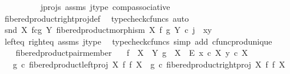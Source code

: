 \begin{isabellebody}
\ \ \ \ \ \ \ \ \isamarkupfalse%
\ j{\isacharunderscore}{\kern0pt}projs\ assms\ j{\isacharunderscore}{\kern0pt}type\ comp{\isacharunderscore}{\kern0pt}associative{}\isanewline
\ \ \ \ \ \ \ \ \isamarkupfalse%
\ fibered{\isacharunderscore}{\kern0pt}product{\isacharunderscore}{\kern0pt}right{\isacharunderscore}{\kern0pt}proj{\isacharunderscore}{\kern0pt}def\ \isamarkupfalse%
\ {\isacharparenleft}{\kern0pt}typecheck{\isacharunderscore}{\kern0pt}cfuncs{\isacharcomma}{\kern0pt}\ auto{\isacharparenright}{\kern0pt}\isanewline
\isanewline
\ \ \ \ \ \ \isamarkupfalse%
\ {\isachardoublequoteopen}snd\ {\isacharparenleft}{\kern0pt}X\ \isactrlbsub f\isactrlesub {\isasymtimes}\isactrlsub c\isactrlbsub g\isactrlesub \ Y{\isacharcomma}{\kern0pt}\ fibered{\isacharunderscore}{\kern0pt}product{\isacharunderscore}{\kern0pt}morphism\ X\ f\ g\ Y{\isacharparenright}{\kern0pt}\ {\isasymcirc}\isactrlsub c\ j\ {\isacharequal}{\kern0pt}\ {\isasymlangle}x{\isacharcomma}{\kern0pt}y{\isasymrangle}{\isachardoublequoteclose}\isanewline
\ \ \ \ \ \ \ \ \isamarkupfalse%
\ left{\isacharunderscore}{\kern0pt}eq\ right{\isacharunderscore}{\kern0pt}eq\ assms\ j{\isacharunderscore}{\kern0pt}type\ \isamarkupfalse%
\ {\isacharparenleft}{\kern0pt}typecheck{\isacharunderscore}{\kern0pt}cfuncs{\isacharcomma}{\kern0pt}\ simp\ add{\isacharcolon}{\kern0pt}\ cfunc{\isacharunderscore}{\kern0pt}prod{\isacharunderscore}{\kern0pt}unique{\isacharparenright}{\kern0pt}\isanewline
\ \ \ \ \isamarkupfalse%
\isanewline
\ \ \isamarkupfalse%
\isanewline
{}\isamarkupfalse%
%
\endisatagproof
{\isafoldproof}%
%
\isadelimproof
\isanewline
%
\endisadelimproof
\isanewline
{}\isamarkupfalse%
\ fibered{\isacharunderscore}{\kern0pt}product{\isacharunderscore}{\kern0pt}pair{\isacharunderscore}{\kern0pt}member{}{\isacharcolon}{\kern0pt}\isanewline
\ \ \ {\isachardoublequoteopen}f\ {\isacharcolon}{\kern0pt}\ X\ {\isasymrightarrow}\ Y{\isachardoublequoteclose}\ {\isachardoublequoteopen}g\ {\isacharcolon}{\kern0pt}\ X\ {\isasymrightarrow}\ E{\isachardoublequoteclose}\ {\isachardoublequoteopen}x\ {\isasymin}\isactrlsub c\ X{\isachardoublequoteclose}\ {\isachardoublequoteopen}y\ {\isasymin}\isactrlsub c\ X{\isachardoublequoteclose}\isanewline
\ \ \ {\isachardoublequoteopen}g\ {\isasymcirc}\isactrlsub c\ fibered{\isacharunderscore}{\kern0pt}product{\isacharunderscore}{\kern0pt}left{\isacharunderscore}{\kern0pt}proj\ X\ f\ f\ X\ {\isacharequal}{\kern0pt}\ g\ {\isasymcirc}\isactrlsub c\ fibered{\isacharunderscore}{\kern0pt}product{\isacharunderscore}{\kern0pt}right{\isacharunderscore}{\kern0pt}proj\ X\ f\ f\ X{\isachardoublequoteclose}\isanewline

\end{isabellebody}
